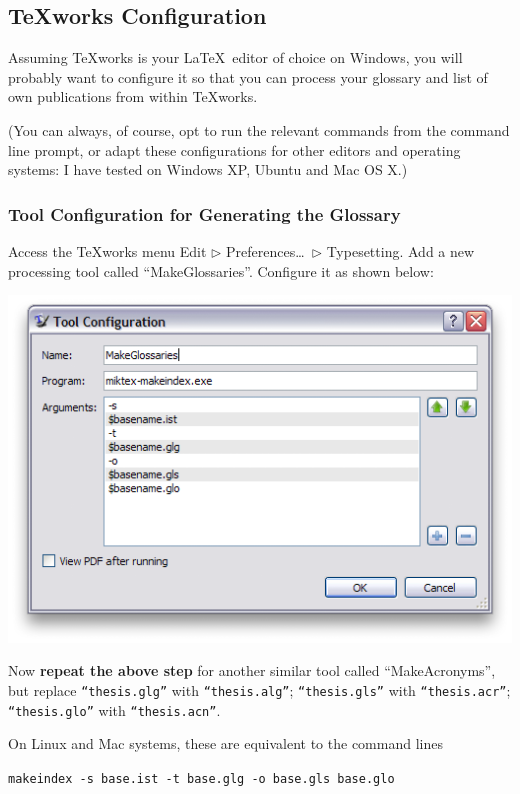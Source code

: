 \documentclass[a4paper,12pt]{scrartcl}
\begin{document}
\subsection{TeXworks Configuration}\label{sec:texworks}
Assuming \textsf{TeXworks} is your \LaTeX\ editor of choice on Windows, you will probably want to configure it so that you can process your glossary and list of own publications from within \textsf{TeXworks}.

(You can always, of course, opt to run the relevant commands from the command line prompt, or adapt these configurations for other editors and operating systems: I have tested on Windows XP, Ubuntu and Mac OS X.)

\subsubsection{Tool Configuration for Generating the Glossary}\label{sec:texworks:makeglossaries}
Access the \textsf{TeXworks} menu \textsf{Edit $\triangleright$ Preferences\ldots\ $\triangleright$ Typesetting}. Add a new processing tool called ``\textsf{MakeGlossaries}''. Configure it as shown below:

\includegraphics[width=.9\textwidth]{texworks-win_glossaries}

Now \textbf{repeat the above step} for another similar tool called ``\textsf{MakeAcronyms}'', but replace \texttt{``thesis.glg''} with \texttt{``thesis.alg''}; \texttt{``thesis.gls''} with \texttt{``thesis.acr''}; \texttt{``thesis.glo''} with \texttt{``thesis.acn''}.

On Linux and Mac systems, these are equivalent to the command lines

\medskip

\hspace{1em}\texttt{makeindex -s \textlangle base\textrangle.ist -t \textlangle base\textrangle.glg -o \textlangle base\textrangle.gls \textlangle base\textrangle.glo}
\end{document}
